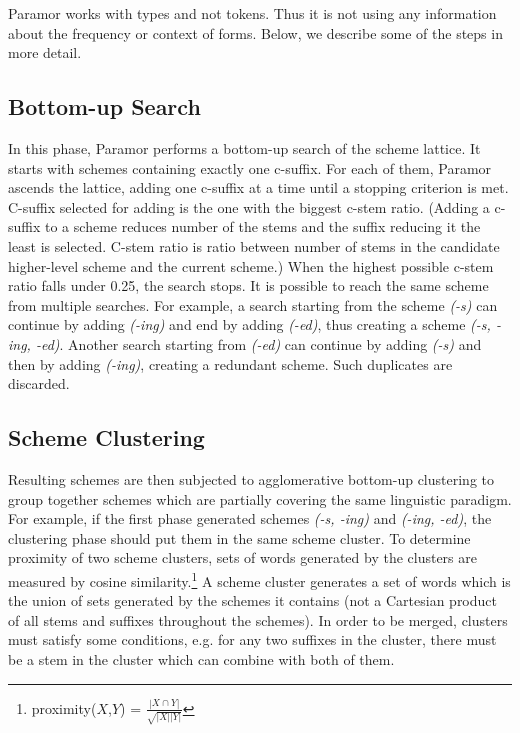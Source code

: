 \documentclass{itatnew}
\newcommand{\e}[1]{\textit{#1}} %
\begin{document}
\noindent
Paramor works with types and not tokens. Thus it is not using any information about the frequency or context of forms.
%
Below, we describe some of the steps in more detail.

\subsection{Bottom-up Search}

\noindent
In this phase, Paramor performs a bottom-up search of the scheme lattice. It starts with schemes containing exactly one c-suffix. For each of them, Paramor ascends the lattice, adding one c-suffix at a time until a stopping criterion is met. C-suffix selected for adding is the one with the biggest c-stem ratio. (Adding a c-suffix to a scheme reduces number of the stems and the suffix reducing it the least is selected. C-stem ratio is ratio between number of stems in the candidate higher-level scheme and the current scheme.) When the highest possible c-stem ratio falls under 0.25, the search stops. It is possible to reach the same scheme from multiple searches. For example, a search starting from the scheme \e{(-s)} can continue by adding \e{(-ing)} and end by adding \e{(-ed)}, thus creating a scheme \e{(-s, -ing, -ed)}. Another search starting from \e{(-ed)} can continue by adding \e{(-s)} and then by adding \e{(-ing)}, creating a redundant scheme. Such duplicates are discarded.

\subsection{Scheme Clustering}

\noindent
Resulting schemes are then subjected to agglomerative bottom-up clustering to group together schemes which are partially covering the same linguistic paradigm.  For example, if the first phase generated schemes \e{(-s, -ing)} and \e{(-ing, -ed)}, the clustering phase should put them in the same scheme cluster. To determine proximity of two scheme clusters, sets of words generated by the clusters are measured by cosine similarity.\footnote{proximity($X$,$Y$) = $\frac{|X \cap Y|}{\sqrt{|X||Y|}}$} A scheme cluster generates a set of words which is the union of sets generated by the schemes it contains (not a Cartesian product of all stems and suffixes throughout the schemes). In order to be merged, clusters must satisfy some conditions, e.g. for any two suffixes in the cluster, there must be a stem in the cluster which can combine with both of them.
\end{document}
